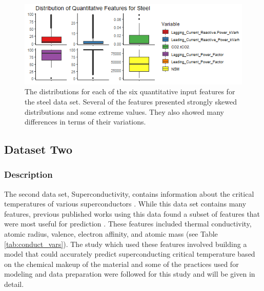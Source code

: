 \documentclass[10pt]{article}\usepackage[]{graphicx}\usepackage[]{xcolor}
\begin{document}
\begin{figure}[htp]
  \centering
  \includegraphics[scale=0.8]{EDA/boxplots_steel_features.png}
  \caption{The distributions for each of the six quantitative input features for the steel data set. Several of the features presented strongly skewed distributions and some extreme values. They also showed many differences in terms of their variations.}
  \label{img:steel_boxplots}
\end{figure}


\subsection{Dataset Two}
\subsubsection{Description}
The second data set, Superconductivity, contains information about the critical temperatures of various superconductors \cite{Data:Conduct}. While this data set contains many features, previous published works using this data found a subset of features that were most useful for prediction \cite{RelatedWork:Conduct}. These features included thermal conductivity, atomic radius, valence, electron affinity, and atomic mass (see Table \ref{tab:conduct_vars}). The study which used these features involved building a model that could accurately predict superconducting critical temperature based on the chemical makeup of the material and some of the practices used for modeling and data preparation were followed for this study and will be given in detail. \\
\end{document}

